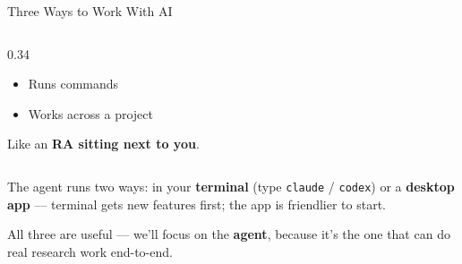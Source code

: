 \documentclass[aspectratio=169, 10pt]{beamer}
\begin{document}
\begin{frame}{Three Ways to Work With AI}
\begin{columns}[T]
\begin{column}{0.34\textwidth}
\begin{tcolorbox}
\begin{itemize}
  \item[\color{SlateTeal}\faCheck] Runs commands
  \item[\color{SlateTeal}\faCheck] Works across a project
\end{itemize}
\vskip2pt
{\color{CoolGray} Like an \textbf{RA sitting next to you}.}
\end{tcolorbox}
\end{column}
\end{columns}
\vskip4pt
{\centering\scriptsize\color{CoolGray} The agent runs two ways: in your \textbf{terminal} (type \texttt{claude} / \texttt{codex}) or a \textbf{desktop app} --- terminal gets new features first; the app is friendlier to start.\par}
\vskip4pt
\begin{tcolorbox}[accentbox, halign=center, top=3pt, bottom=3pt]
\small All three are useful --- we'll focus on the \textbf{agent}, because it's the one that can do real research work end-to-end.
\end{tcolorbox}
\end{frame}
\end{document}
